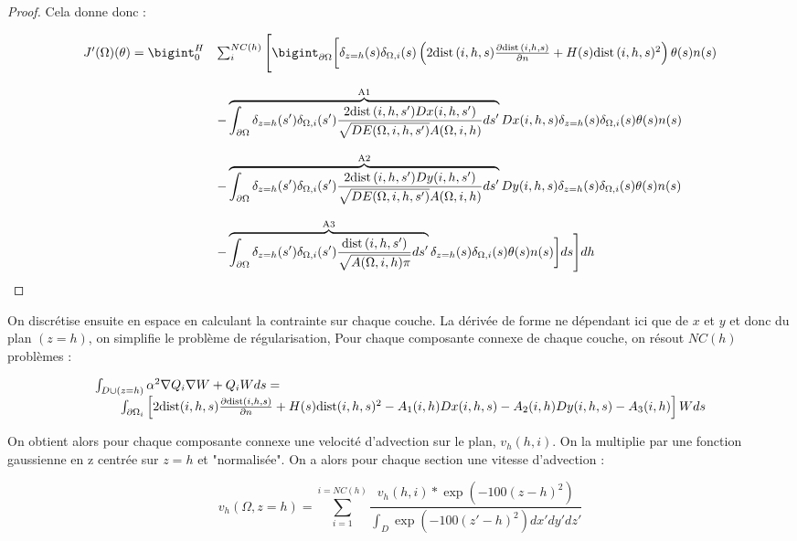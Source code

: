 \documentclass[11pt,a4paper]{article}
\begin{document}
\begin{proof}
	Cela donne donc :
	
	\begin{equation}
	\begin{array}{ll}
	J'(\Omega)(\theta)=\bigint_0^H&\sum_{i}^{NC(h)}\Bigg[\bigintpO\bigg[ \delta_{z=h}(s)\delta_{\Omega,i}(s)\left(2\dist(i,h,s)\frac{\partial\dist(i,h,s)}{\partial n}+H(s)\dist(i,h,s)^2\right)\theta(s)n(s)\\
	\\
	\,&-\overbrace{\intpO \delta_{z=h}(s')\delta_{\Omega,i}(s')\frac{2\dist(i,h,s')Dx(i,h,s')}{\sqrt{DE(\Omega,i,h,s')}A(\Omega,i,h)}ds'}^\text{A1} Dx(i,h,s)\delta_{z=h}(s)\delta_{\Omega,i}(s)\theta(s)n(s) \\
	\\
	\, & -\overbrace{\intpO \delta_{z=h}(s')\delta_{\Omega,i}(s')\frac{2\dist(i,h,s')Dy(i,h,s')}{\sqrt{DE(\Omega,i,h,s')}A(\Omega,i,h)}ds'}^\text{A2} Dy(i,h,s)\delta_{z=h}(s)\delta_{\Omega,i}(s)\theta(s)n(s)\\
	\\
	\, & -\overbrace{\intpO \delta_{z=h}(s')\delta_{\Omega,i}(s')\frac{\dist(i,h,s')}{\sqrt{A(\Omega,i,h)\pi}}ds'}^\text{A3} \delta_{z=h}(s)\delta_{\Omega,i}(s)\theta(s)n(s)\bigg]ds \Bigg]dh
	\end{array}
	\end{equation}
\end{proof}	

	On discrétise ensuite en espace en calculant la contrainte sur chaque couche. 
	La dérivée de forme ne dépendant ici que de $x$ et $y$ et donc du plan $(z=h)$, on simplifie le problème de régularisation, Pour chaque composante connexe de chaque couche, on résout $NC(h)$ problèmes :
	
	\begin{equation}
	\begin{array}{l}
	\int_{D\cup (z=h)} \alpha^2\nabla Q_i\nabla W+Q_iWds=\\
	\qquad\int_{\partial\Omega_{i}}\left[2\textrm{dist}(i,h,s)\frac{\partial\textrm{dist}(i,h,s)}{\partial n}+H(s)\textrm{dist}(i,h,s)^2-A_1(i,h)Dx(i,h,s)-A_2(i,h)Dy(i,h,s)-A_3(i,h)\right]Wds
	\end{array}
	\end{equation}
	
	On obtient alors pour chaque composante connexe une velocité d'advection sur le plan, $v_h(h,i)$. On la multiplie par une fonction gaussienne en z centrée sur $z=h$ et "normalisée". On a alors pour chaque section une vitesse d'advection :
	
	\begin{equation}
	v_h(\Omega,z=h)=\sum_{i=1}^{i=NC(h)}\frac{v_h(h,i)*\exp(-100(z-h)^2)}{\int_D \exp(-100(z'-h)^2)dx'dy'dz'}
	\end{equation}
	
\end{document}
